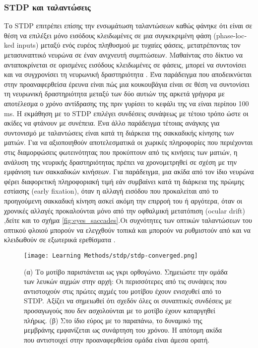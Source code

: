 \documentclass[12pt]{report}
\begin{document}
\subsubsection{\textlatin{STDP} και ταλαντώσεις}
Το \textlatin{STDP} επιτρέπει επίσης την ενσωμάτωση ταλαντώσεων καθώς φάνηκε ότι είναι σε θέση να επιλέξει μόνο εισόδους κλειδωμένες σε μια συγκεκριμένη φάση (\textlatin{phase-locked inputs}) μεταξύ ενός ευρέος πληθυσμού με τυχαίες φάσεις, μετατρέποντας τον μετασυναπτικό νευρώνα σε έναν ανιχνευτή συμπτώσεων. Μαθαίντας στο δίκτυο να ανταποκρίνεται σε ορισμένες εισόδους κλειδωμένες σε φάσεις, μπορεί να συντονίσει και να συγχρονίσει τη νευρωνική δραστηριότητα \cite{Gerstner1996}. Ένα παράδειγμα που αποδεικνύεται στην προαναφερθείσα έρευνα είναι πώς μια κουκουβάγια είναι σε θέση να συντονίσει τη νευρωνική δραστηριότητα μεταξύ των δύο αυτιών της αρκετά γρήγορα με αποτέλεσμα ο χρόνο αντίδρασης της πριν γυρίσει το κεφάλι της να είναι περίπου 100 \textlatin{ms}. Η εκμάθηση με το \textlatin{STDP} επιλέγει συνδέσεις συνάψεως με τέτοιο τρόπο ώστε οι ακίδες να φτάνουν με συνέπεια. Ένα άλλο παράδειγμα τέτοιας ανάγκης για συντονισμό με ταλαντώσεις είναι κατά τη διάρκεια της σακκαδικής κίνησης των ματιών. Για να αξιοποιηθούν αποτελεσματικά οι χωρικές πληροφορίες που περιέχονται στις διαμορφώσεις φωτεινότητας που προκύπτουν από τις κινήσεις των ματιών, η ανάλυση της νευρικής δραστηριότητας πρέπει να χρονομετρηθεί σε σχέση με την εμφάνιση των σακκαδικών κινήσεων. Για παράδειγμα, μια ακίδα από τον ίδιο νευρώνα φέρει διαφορετική πληροφοριακή τιμή εάν συμβαίνει κατά τη διάρκεια της πρώιμης εστίασης (\textlatin{early fixation}), όταν η αλλαγή εισόδου που προκαλείται από το προηγούμενη σακκαδική κίνηση ασκεί ακόμη την επιρροή του ή αργότερα, όταν οι χρονικές αλλαγές προκαλούνται μόνο από την οφθαλμική μετατόπιση (\textlatin{ocular drift})  \cite{Rucci2018 },δείτε και το σχήμα \ref{fig:eyes_saccades}.Οι συχνότητες των οπτικών ταλαντώσεων του οπτικού φλοιού μπορούν να ελεγχθούν τοπικά και μπορούν να ρυθμιστούν από και να κλειδωθούν σε εξωτερικά ερεθίσματα \cite{Ahissar2012}.

\begin{figure}[htp]
    \centering
    \texttt{[image: Learning Methods/stdp/stdp-converged.png]}
    \caption{(α) Το μοτίβο παριστάνεται ως γκρι ορθογώνιο. Σημειώστε την ομάδα των λευκών αιχμών στην αρχή: Οι περισσότερες από τις συνάψεις που αντιστοιχούν στις πρώτες αιχμές του μοτίβου έχουν ενισχυθεί από το STDP. Αξίζει να σημειωθεί ότι σχεδόν όλες οι συναπτικές συνδέσεις με προσαγωγούς που δεν ασχολούνται με το μοτίβο έχουν καταργηθεί πλήρως. (β) Στο ίδιο εύρος με το παραπάνω, το δυναμικό της μεμβράνης εμφανίζεται ως συνάρτηση του χρόνου. Η απότομη ακίδα που αντιστοιχεί στην προαναφερθείσα ομάδα είναι άμεσα ορατή\cite{Masquelier2008}.} 
    \label{fig:stdp-converged}
\end{figure}
\end{document}
